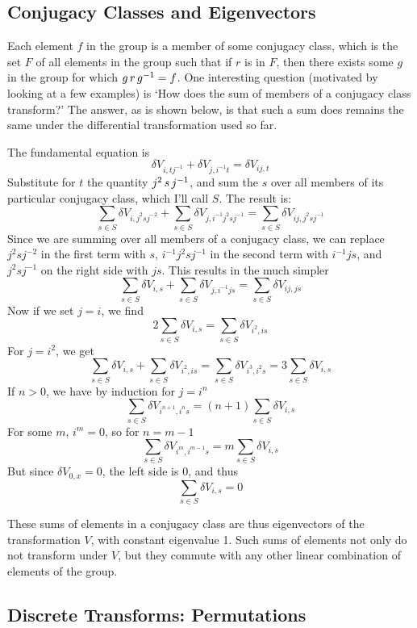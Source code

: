 \documentclass[12pt]{article}
\begin{document}
\subsection{ Conjugacy Classes and Eigenvectors}

 Each element $f$ in the group is a member of some conjugacy class,
which is the set $F$ of all elements in the group such that
if $r$ is in $F$, then there exists some $g$ in the group for which
$g \thinspace r \thinspace g^{-1} = f$.  One interesting question
(motivated by looking at a few examples) is `How does the sum of
members of a conjugacy class transform?'  The answer, as is shown
below, is that such a sum does remains the same under the differential
transformation used so far.

 The fundamental equation is
$$\delta V_{i,tj^{-1}} + \delta V_{j,i^{-1}t} = \delta V_{ij,t}$$
Substitute for $t$ the quantity $j^2 \thinspace s \thinspace j^{-1}$, and
sum the $s$ over all members of its particular conjugacy class, which
I'll call $S$.  The result is:
$$\sum_{s \in S} \delta V_{i,j^2 s j^{-2}} +
\sum_{s \in S} \delta V_{j,i^{-1}j^2 s j^{-1}} =
\sum_{s \in S} \delta V_{ij,j^2 s j^{-1}}$$
Since we are summing over all members of a conjugacy class, we can
replace $j^2 s j^{-2}$ in the first term with $s$, $i^{-1}j^2 s j^{-1}$
in the second term with $i^{-1}j s$, and $j^2 s j^{-1}$ on the
right side with $j s$.  This results in the much simpler
$$\sum_{s \in S} \delta V_{i,s} +
\sum_{s \in S} \delta V_{j,i^{-1}j s} =
\sum_{s \in S} \delta V_{ij,j s}$$
Now if we set $j=i$, we find
$$2\sum_{s \in S} \delta V_{i,s} =
\sum_{s \in S} \delta V_{i^2,i s}$$
For $j=i^2$, we get
$$\sum_{s \in S} \delta V_{i,s} +
\sum_{s \in S} \delta V_{i^2,i s} =
\sum_{s \in S} \delta V_{i^3,i^2 s} = 3\sum_{s \in S} \delta V_{i,s}$$
If $n >0$, we have by induction for $j=i^n$
$$\sum_{s \in S} \delta V_{i^{n+1},i^n s} = (n+1)\sum_{s \in S} \delta V_{i,s}$$
For some $m$, $i^m = 0$, so for $n=m-1$
$$\sum_{s \in S} \delta V_{i^m,i^{m-1} s} = m\sum_{s \in S} \delta V_{i,s}$$
But since $\delta V_{0,x} = 0$, the left side is 0, and thus
$$\sum_{s \in S} \delta V_{i,s} = 0$$

 These sums of elements in a conjugacy class are thus eigenvectors of the
transformation $V$, with constant eigenvalue 1.  Such sums of elements
not only do not transform under $V$, but they commute with any other
linear combination of elements of the group.

\subsection{ Discrete Transforms: Permutations}
\end{document}

